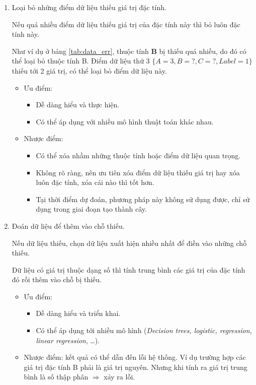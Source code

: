 \documentclass[../main-report.tex]{subfiles}
\begin{document}
\begin{enumerate}
\item Loại bỏ những điểm dữ liệu thiếu giá trị đặc tính.

Nếu quá nhiều điểm dữ liệu thiếu giá trị của đặc tính này thì bỏ luôn đặc tính này.

Như ví dụ ở bảng \ref{tab:data_err}, thuộc tính \textbf{B} bị thiếu quá nhiều, do đó có thể loại bỏ thuộc tính B. Điểm dữ liệu thứ 3 $\{A=3, B=?, C=?, Label=1 \}$ thiếu tới 2 giá trị, có thể loại bỏ điểm dữ liệu này.

\begin{itemize}
\item Ưu điểm:
\begin{itemize}
\item Dễ dàng hiểu và thực hiện.
\item Có thể áp dụng với nhiều mô hình thuật toán khác nhau.
\end{itemize}
\item Nhược điểm:
\begin{itemize}
\item Có thể xóa nhầm những thuộc tính hoặc điểm dữ liệu quan trọng.
\item Không rõ ràng, nên ưu tiên xóa điểm dữ liệu thiếu giá trị hay xóa luôn đặc tính, xóa cái nào thì tốt hơn.
\item Tại thời điểm dự đoán, phương pháp này không sử dụng được, chỉ sử dụng trong giai đoạn tạo thành cây.
\end{itemize}
\end{itemize}

\item Đoán dữ liệu để thêm vào chỗ thiếu.

Nếu dữ liệu thiếu, chọn dữ liệu xuất hiện nhiều nhất để điền vào những chỗ thiếu.

Dữ liệu có giá trị thuộc dạng số thì tính trung bình các giá trị của đặc tính đó rồi thêm vào chỗ bị thiếu.

\begin{itemize}
\item Ưu điểm:
\begin{itemize}
\item Dễ dàng hiểu và triển khai.
\item Có thể áp dụng tới nhiều mô hình (\emph{Decision trees, logistic, regression, linear regression}, \ldots).
\end{itemize}
\item Nhược điểm: kết quả có thể dẫn đến lỗi hệ thống. Ví dụ trường hợp các giá trị đặc tính B phải là giá trị nguyên. Nhưng khi tính ra giá trị trung bình là số thập phân $\Rightarrow$ xảy ra lỗi.
\end{itemize}


\end{enumerate}
\end{document}
